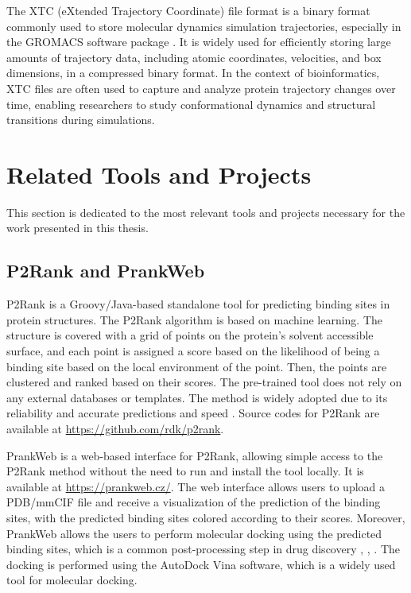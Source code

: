 The XTC (eXtended Trajectory Coordinate) file format is a binary format commonly used to store molecular dynamics simulation trajectories, especially in the GROMACS software package \cite{van2005gromacs}. It is widely used for efficiently storing large amounts of trajectory data, including atomic coordinates, velocities, and box dimensions, in a compressed binary format. In the context of bioinformatics, XTC files are often used to capture and analyze protein trajectory changes over time, enabling researchers to study conformational dynamics and structural transitions during simulations.

\section{Related Tools and Projects}
\label{sec:related-tools}

This section is dedicated to the most relevant tools and projects necessary for the work presented in this thesis.

\subsection{P2Rank and PrankWeb}
\label{sec:prankweb-p2rank}

P2Rank is a Groovy/Java-based standalone tool for predicting binding sites in protein structures. The P2Rank algorithm is based on machine learning. The structure is covered with a grid of points on the protein's solvent accessible surface, and each point is assigned a score based on the likelihood of being a binding site based on the local environment of the point. Then, the points are clustered and ranked based on their scores. The pre-trained tool does not rely on any external databases or templates. The method is widely adopted due to its reliability and accurate predictions and speed \cite{krivak2018p2rank}. Source codes for P2Rank are available at \url{https://github.com/rdk/p2rank}.

PrankWeb is a web-based interface for P2Rank, allowing simple access to the P2Rank method without the need to run and install the tool locally. It is available at \url{https://prankweb.cz/}. The web interface allows users to upload a PDB/mmCIF file and receive a visualization of the prediction of the binding sites, with the predicted binding sites colored according to their scores. Moreover, PrankWeb allows the users to perform molecular docking using the predicted binding sites, which is a common post-processing step in drug discovery \cite{polak2025prankweb}, \cite{jakubec2022prankweb}, \cite{jendele2019prankweb}. The docking is performed using the AutoDock Vina \cite{trott2010autodock} software, which is a widely used tool for molecular docking.

